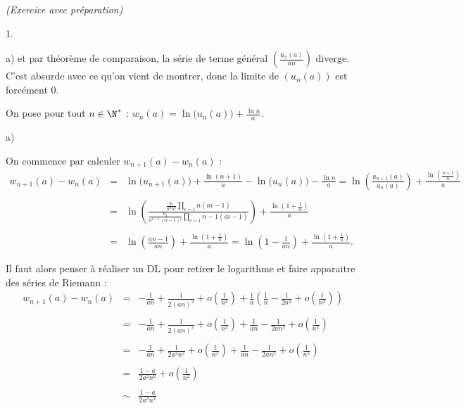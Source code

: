 \documentclass[11pt]{article}%
\begin{document}
\begin{exercice}{\it (Exercice avec préparation)}
\begin{noliste}{1.}
\begin{noliste}{a)}
 et par théorème de comparaison, la série de terme général $\left(
\frac{ u_{n}(a) }{ a n } \right)$ diverge. C'est absurde avec ce qu'on
vient de montrer, donc la limite de $(u_{n} (a) )$ est forcément 0. \\

 \end{noliste}

 \item On pose pour tout $n \in \N^*$ : $w_{n} (a) = \ln \big( u_{n}
(a) \big) + \frac{ \ln n }{ a }$. \begin{noliste}{a)}
 \setlength{\itemsep}{2mm}

 \item On commence par calculer $w_{n + 1} (a) - w_{n} (a)$ : 
 \begin{eqnarray*}
 w_{n + 1} (a) - w_{n} (a) & = & \ln \big( u_{n + 1} (a) \big) + \frac{
\ln (n + 1) }{ a } - \ln \big( u_{n} (a) \big) - \frac{ \ln n }{ a } =
\ln \left( \frac{ u_{n + 1} (a) }{ u_{n} (a) } \right) + \frac{ \ln
\left( \frac{ n + 1 }{ n } \right) }{ a } \\
\\
 & = & \ln \left( \frac{ \frac{ u_{1} }{ a^{n} n! } \prod\limits_{i =
1}{n} (a i - 1 ) }{ \frac{ u_{1} }{ a^{n-1} (n-1)! } \prod\limits_{i =
1}{n-1} (a i - 1 ) } \right) + \frac{ \ln \left( 1 + \frac{ 1 }{ n }
\right) }{ a } \\
\\
 & = & \ln \left( \frac{ a n - 1 }{ a n } \right) + \frac{ \ln \left( 1
+ \frac{ 1 }{ n } \right) }{ a } = \ln \left( 1 - \frac{ 1 }{ a n }
\right) + \frac{ \ln \left( 1 + \frac{ 1 }{ n } \right) }{ a }. \end{eqnarray*}

 Il faut alors penser à réaliser un DL pour retirer le logarithme et
faire apparaitre des séries de Riemann : 
 \begin{eqnarray*}
 w_{n + 1} (a) - w_{n} (a) & = & - \frac{ 1 }{ a n } + \frac{ 1 }{ 2 (a
n)^{2} } + o \left( \frac{ 1 }{ n^{2} } \right) + \frac{ 1 }{ a }
\left( \frac{ 1 }{ n } - \frac{ 1 }{ 2 n^{2} } + o \left( \frac{ 1 }{
n^{2} } \right) \right) \\
\\
 & = & - \frac{ 1 }{ a n } + \frac{ 1 }{ 2 (a n)^{2} } + o \left(
\frac{ 1 }{ n^{2} } \right) + \frac{ 1 }{ a n } - \frac{ 1 }{ 2 a n^{2}
} + o \left( \frac{ 1 }{ n^{2} } \right) \\
\\
 & = & - \frac{ 1 }{ a n } + \frac{ 1 }{ 2 a^{2} n^{2} } + o \left(
\frac{ 1 }{ n^{2} } \right) + \frac{ 1 }{ a n } - \frac{ 1 }{ 2 a n^{2}
} + o \left( \frac{ 1 }{ n^{2} } \right) \\
\\
 & = & \frac{ 1 - a }{ 2 a^{2} n^{2} } + o \left( \frac{ 1 }{ n^{2} }
\right) \\
\\
 & \sim & \frac{ 1 - a }{ 2 a^{2} n^{2} } \end{eqnarray*}


\end{noliste}
\end{noliste}
\end{exercice}
\end{document}
